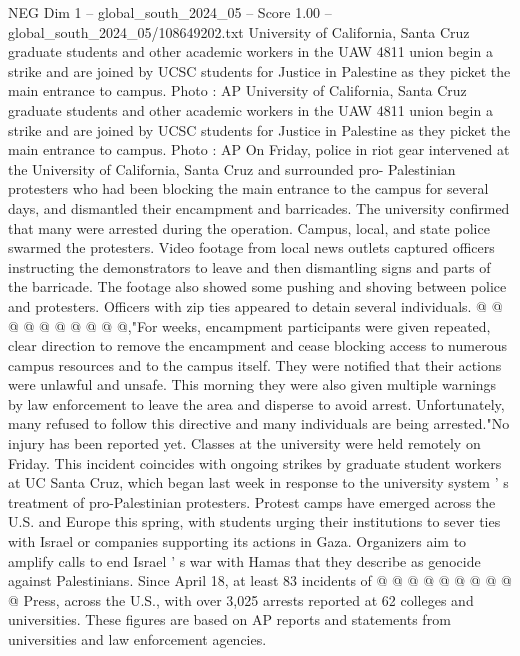 \begin{textsample}{NEG Dim 1 – global\_south\_2024\_05 – Score 1.00 – global\_south\_2024\_05/108649202.txt}  \label{ex:f1_neg_207}
University of California, Santa Cruz graduate students and other academic workers in the UAW 4811 union begin a strike and are joined by UCSC students for Justice in Palestine as they picket the main entrance to campus.
Photo : AP University of California, Santa Cruz graduate students and other academic workers in the UAW 4811 union begin a strike and are joined by UCSC students for Justice in Palestine as they picket the main entrance to campus.
Photo : AP On Friday, police in riot gear intervened at the University of California, Santa Cruz and surrounded pro- Palestinian protesters who had been blocking the main entrance to the campus for several days, and dismantled their encampment and barricades.
The university confirmed that many were arrested during the operation.
Campus, local, and state police swarmed the protesters.
Video footage from local news outlets captured officers instructing the demonstrators to leave and then dismantling signs and parts of the barricade.
The footage also showed some pushing and shoving between police and protesters.
Officers with zip ties appeared to detain several individuals. @ @ @ @ @ @ @ @ @ @,"For weeks, encampment participants were given repeated, clear direction to remove the encampment and cease blocking access to numerous campus resources and to the campus itself.
They were notified that their actions were unlawful and unsafe.
This morning they were also given multiple warnings by law enforcement to leave the area and disperse to avoid arrest.
Unfortunately, many refused to follow this directive and many individuals are being arrested."No injury has been reported yet.
Classes at the university were held remotely on Friday.
This incident coincides with ongoing strikes by graduate student workers at UC Santa Cruz, which began last week in response to the university system ' s treatment of pro-Palestinian protesters.
Protest camps have emerged across the U.S. and Europe this spring, with students urging their institutions to sever ties with Israel or companies supporting its actions in Gaza.
Organizers aim to amplify calls to end Israel ' s war with Hamas that they describe as genocide against Palestinians.
Since April 18, at least 83 incidents of @ @ @ @ @ @ @ @ @ @ Press, across the U.S., with over 3,025 arrests reported at 62 colleges and universities.
These figures are based on AP reports and statements from universities and law enforcement agencies.

\end{textsample}
